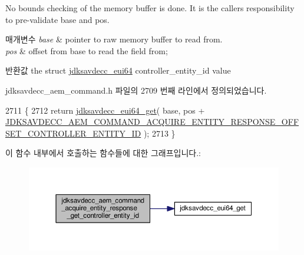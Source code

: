 No bounds checking of the memory buffer is done. It is the caller\textquotesingle{}s responsibility to pre-\/validate base and pos.


\begin{DoxyParams}{매개변수}
{\em base} & pointer to raw memory buffer to read from. \\
\hline
{\em pos} & offset from base to read the field from; \\
\hline
\end{DoxyParams}
\begin{DoxyReturn}{반환값}
the struct \hyperlink{structjdksavdecc__eui64}{jdksavdecc\+\_\+eui64} controller\+\_\+entity\+\_\+id value 
\end{DoxyReturn}


jdksavdecc\+\_\+aem\+\_\+command.\+h 파일의 2709 번째 라인에서 정의되었습니다.


\begin{DoxyCode}
2711 \{
2712     \textcolor{keywordflow}{return} \hyperlink{group__eui64_ga2652311a25a6b91cddbed75c108c7031}{jdksavdecc\_eui64\_get}( base, pos + 
      \hyperlink{group__command__acquire__entity__response_ga0d13e0e50bafffb57a69a21b7de6083e}{JDKSAVDECC\_AEM\_COMMAND\_ACQUIRE\_ENTITY\_RESPONSE\_OFFSET\_CONTROLLER\_ENTITY\_ID}
       );
2713 \}
\end{DoxyCode}


이 함수 내부에서 호출하는 함수들에 대한 그래프입니다.\+:
\nopagebreak
\begin{figure}[H]
\begin{center}
\leavevmode
\includegraphics[width=350pt]{group__command__acquire__entity__response_gac504ca038375677c111124c137be683e_cgraph}
\end{center}
\end{figure}


